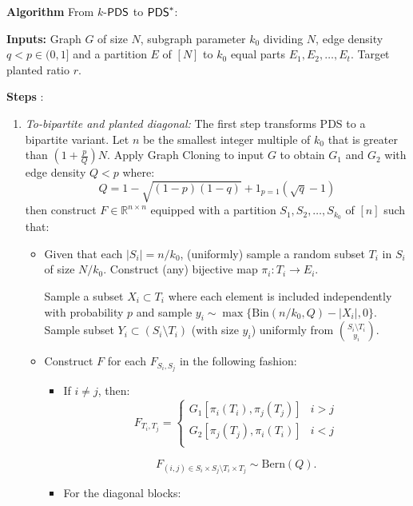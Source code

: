 
\needspace{20cm}
\begin{mdframed}[innerrightmargin=15pt]
 \textbf{Algorithm } From $k$-$\mathsf{PDS}$ to $\mathsf{PDS}^*$:
 
        \textbf{Inputs:} Graph $G$ of size $N$, subgraph parameter $k_0$ dividing $N$, edge density $q < p\in (0, 1]$ and a partition $E$ of $[N]$ to $k_0$ equal parts $E_1, E_2,\dots, E_t$. Target planted ratio $r$.
        
        \textbf{Steps }:
        \vspace{-5pt}
        \begin{enumerate}
            \item \textit{To-bipartite and planted diagonal:} The first step transforms PDS to a bipartite variant. Let $n$ be the smallest integer multiple of $k_0$ that is greater than $(1+\frac{p}{Q})N$. Apply Graph Cloning to input $G$ to obtain $G_1$ and $G_2$ with edge density $Q<p$ where: $$Q=1-\sqrt{(1-p)(1-q)}+1_{p=1}(\sqrt{q}-1)$$then construct $F\in\mathbb{R}^{n\times n}$ equipped with a partition $S_1, S_2,\dots, S_{k_0}$ of $[n]$ such that:
            
            \vspace{-3pt}
            \begin{itemize}
                \item Given that each $|S_i|=n/k_0$, (uniformly) sample a random subset $T_i$ in $S_i$ of size $N/k_0$. Construct (any) bijective map $\pi_i: T_i\to E_i$.
                
                Sample a subset $X_i\subset T_i$ where each element is included independently with probability $p$ and sample $y_i\sim \max\{\text{Bin}(n/k_0, Q)-|X_i|, 0\}$. Sample subset $Y_i\subset(S_i\setminus T_i)$ (with size $y_i$) uniformly from $S_i\setminus T_i\choose y_i$.
                \item Construct $F$ for each $F_{S_i, S_j}$ in the following fashion:\begin{itemize}
                    \item If $i\neq j$, then: $$F_{T_i, T_j}=\begin{cases} 
                                G_1{[\pi_i(T_i), \pi_j(T_j)]} & i>j \\
                                G_2{[\pi_j(T_j), \pi_i(T_i)]}        & i<j \\
                                \end{cases}
                    $$ 
                    
                    \vspace{-2mm}
                    $$F_{(i, j)\in S_i\times S_j\setminus T_i\times T_j}\sim \text{Bern}(Q).$$
                    \item For the diagonal blocks:
                    

\end{itemize}
\end{itemize}
\end{enumerate}
\end{mdframed}
